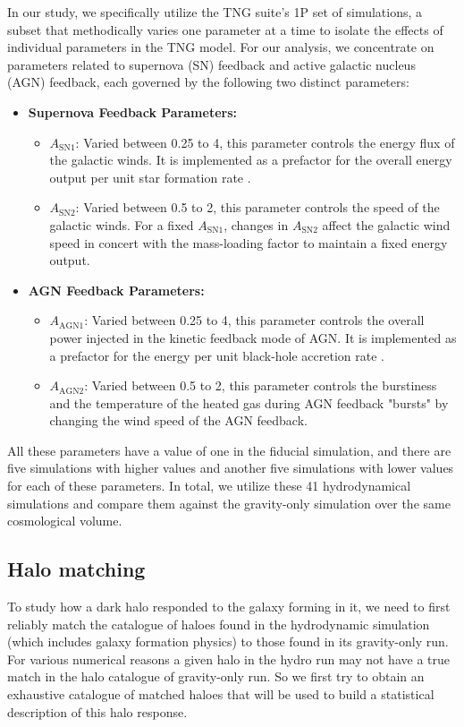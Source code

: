 In our study, we specifically utilize the TNG suite's 1P set of simulations, a subset that methodically varies one parameter at a time to isolate the effects of individual parameters in the TNG model. For our analysis, we concentrate on parameters related to supernova (SN) feedback and active galactic nucleus (AGN) feedback, each governed by the following two distinct parameters:
% 
\begin{itemize}
    \item \textbf{Supernova Feedback Parameters:}
    \begin{itemize}
        \item $A_{\mathrm{SN1}}$: Varied between 0.25 to 4, this parameter controls the energy flux of the galactic winds. It is implemented as a prefactor for the overall energy output per unit star formation rate \cite{2018MNRAS.473.4077P,CAMELS_presentation}.
        \item $A_{\mathrm{SN2}}$: Varied between 0.5 to 2, this parameter controls the speed of the galactic winds. For a fixed $A_{\mathrm{SN1}}$, changes in $A_{\mathrm{SN2}}$ affect the galactic wind speed in concert with the mass-loading factor to maintain a fixed energy output.
    \end{itemize}
    \item \textbf{AGN Feedback Parameters:}
    \begin{itemize}
        \item $A_{\mathrm{AGN1}}$: Varied between 0.25 to 4, this parameter controls the overall power injected in the kinetic feedback mode of AGN. It is implemented as a prefactor for the energy per unit black-hole accretion rate \cite{2017MNRAS.465.3291W,CAMELS_presentation}.
        \item $A_{\mathrm{AGN2}}$: Varied between 0.5 to 2, this parameter controls the burstiness and the temperature of the heated gas during AGN feedback "bursts" by changing the wind speed of the AGN feedback.
    \end{itemize}
\end{itemize}
% 
All these parameters have a value of one in the fiducial simulation, and there are five simulations with higher values and another five simulations with lower values for each of these parameters. In total, we utilize these 41 hydrodynamical simulations and compare them against the gravity-only simulation over the same cosmological volume.



\subsection{Halo matching}
\label{sec:methods-match-ch:z0main}
To study how a dark halo responded to the galaxy forming in it, we need to first reliably match the catalogue of haloes found in the hydrodynamic simulation (which includes galaxy formation physics) to those found in its gravity-only run. For various numerical reasons a given halo in the hydro run may not have a true match in the halo catalogue of gravity-only run. So we first try to obtain an exhaustive catalogue of matched haloes that will be used to build a statistical description of this halo response.


